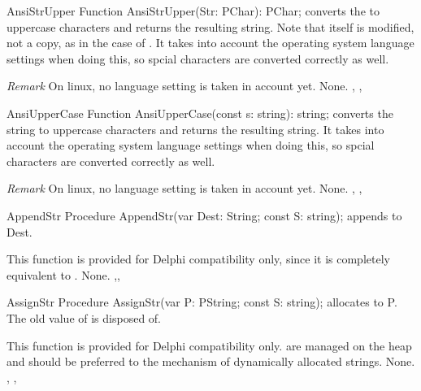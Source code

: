 

\begin{function}{AnsiStrUpper}
\Declaration
Function AnsiStrUpper(Str: PChar): PChar;
\Description
{} converts the   to uppercase characters
and returns the resulting string. Note that  itself is modified,
not a copy, as in the case of .
It takes into account the operating system language
settings when doing this, so spcial characters are converted correctly as
well.

{\em Remark} On linux, no language setting is taken in account yet.
\Errors
None.
\SeeAlso
{}, , 
\end{function}



\begin{function}{AnsiUpperCase}
\Declaration
Function AnsiUpperCase(const s: string): string;
\Description
{} converts the string  to uppercase characters
and returns the resulting string.
It takes into account the operating system language
settings when doing this, so spcial characters are converted correctly as
well.

{\em Remark} On linux, no language setting is taken in account yet.
\Errors
None.
\SeeAlso
{}, , 
\end{function}



\begin{procedure}{AppendStr}
\Declaration
Procedure AppendStr(var Dest: String; const S: string);
\Description
{} appends  to Dest.

This function is provided for Delphi
compatibility only, since it is completely equivalent to .
\Errors
None.
\SeeAlso
{},, 
\end{procedure}



\begin{procedure}{AssignStr}
\Declaration
Procedure AssignStr(var P: PString; const S: string);
\Description
{} allocates  to P. The old value of  is
disposed of.

This function is provided for Delphi compatibility only. 
are managed on the heap and should be preferred to the mechanism of
dynamically allocated strings.
\Errors
None.
\SeeAlso
{}, , 
\end{procedure}

